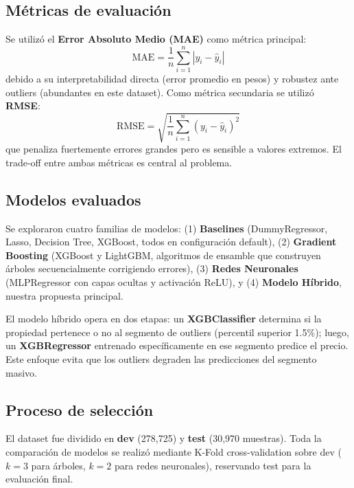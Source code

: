 \documentclass[conference]{IEEEtran}
\begin{document}
    \subsection{Métricas de evaluación}

    Se utilizó el \textbf{Error Absoluto Medio (MAE)} como métrica principal:
    \begin{equation}
        \text{MAE} = \frac{1}{n} \sum_{i=1}^{n} |y_i - \hat{y}_i|
    \end{equation}
    debido a su interpretabilidad directa (error promedio en pesos) y robustez ante outliers (abundantes en este dataset). Como métrica secundaria se utilizó \textbf{RMSE}:
    \begin{equation}
        \text{RMSE} = \sqrt{\frac{1}{n} \sum_{i=1}^{n} (y_i - \hat{y}_i)^2}
    \end{equation}
    que penaliza fuertemente errores grandes pero es sensible a valores extremos. El trade-off entre ambas métricas es central al problema.

    \subsection{Modelos evaluados}

    Se exploraron cuatro familias de modelos: (1) \textbf{Baselines} (DummyRegressor, Lasso, Decision Tree, XGBoost, todos en configuración default), (2) \textbf{Gradient Boosting} (XGBoost y LightGBM, algoritmos de ensamble que construyen árboles secuencialmente corrigiendo errores), (3) \textbf{Redes Neuronales} (MLPRegressor con capas ocultas y activación ReLU), y (4) \textbf{Modelo Híbrido}, nuestra propuesta principal.

    El modelo híbrido opera en dos etapas: un \textbf{XGBClassifier} determina si la propiedad pertenece o no al segmento de outliers (percentil superior 1.5\%); luego, un \textbf{XGBRegressor} entrenado específicamente en ese segmento predice el precio. Este enfoque evita que los outliers degraden las predicciones del segmento masivo. 

    \subsection{Proceso de selección}

    El dataset fue dividido en \textbf{dev} (278,725) y \textbf{test} (30,970 muestras). Toda la comparación de modelos se realizó mediante K-Fold cross-validation sobre dev ($k=3$ para árboles, $k=2$ para redes neuronales), reservando test para la evaluación final.
\end{document}
